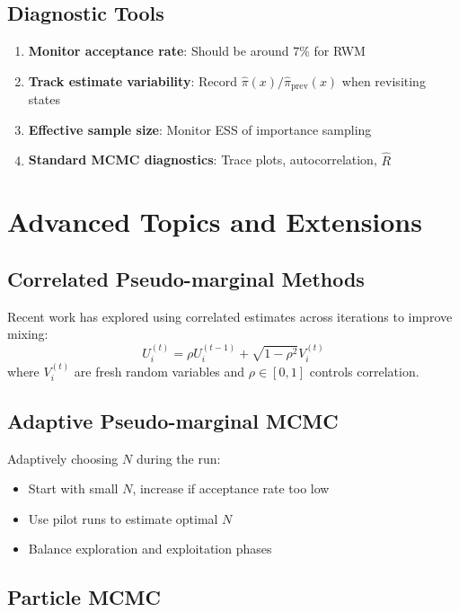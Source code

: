 \documentclass[11pt]{article}
\theoremstyle{definition}
\begin{document}
\subsection{Diagnostic Tools}

\begin{enumerate}
\item \textbf{Monitor acceptance rate}: Should be around $7\%$ for RWM
\item \textbf{Track estimate variability}: Record $\hat{\pi}(x)/\hat{\pi}_{\text{prev}}(x)$ when revisiting states
\item \textbf{Effective sample size}: Monitor ESS of importance sampling
\item \textbf{Standard MCMC diagnostics}: Trace plots, autocorrelation, $\hat{R}$
\end{enumerate}

\section{Advanced Topics and Extensions}

\subsection{Correlated Pseudo-marginal Methods}

Recent work has explored using correlated estimates across iterations to improve mixing:
\begin{equation}
U_i^{(t)} = \rho U_i^{(t-1)} + \sqrt{1-\rho^2} V_i^{(t)}
\end{equation}
where $V_i^{(t)}$ are fresh random variables and $\rho \in [0,1]$ controls correlation.

\subsection{Adaptive Pseudo-marginal MCMC}

Adaptively choosing $N$ during the run:
\begin{itemize}
\item Start with small $N$, increase if acceptance rate too low
\item Use pilot runs to estimate optimal $N$
\item Balance exploration and exploitation phases
\end{itemize}

\subsection{Particle MCMC}
\end{document}
